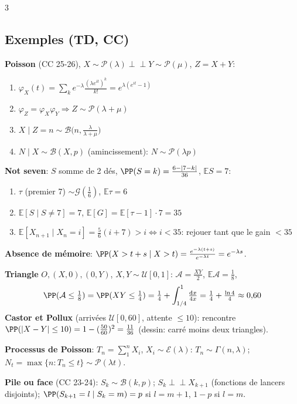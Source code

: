 \documentclass[12pt, a4paper]{article}
\newcommand{\dd}{\mathrm{d}}
\newcommand{\E}{\mathbb{E}}
\begin{document}
\begin{multicols*}{3}
	\colbreak
	\subsection{Exemples (TD, CC)}
	\textbf{Poisson} (CC 25-26), $X\sim\mathcal P(\lambda)\perp\!\!\!\perp Y\sim\mathcal P(\mu)$, $Z=X+Y$:
	\begin{enumerate}[\roman*.]
		\item $\varphi_X(t)=\sum_k e^{-\lambda}\frac{(\lambda e^{it})^k}{k!}=e^{\lambda(e^{it}-1)}$
		\item $\varphi_Z=\varphi_X\varphi_Y\Rightarrow Z\sim\mathcal P(\lambda+\mu)$
		\item $X\mid Z=n\sim\mathcal B\big(n,\frac\lambda{\lambda+\mu}\big)$
		\item $N\mid X\sim\mathcal B(X,p)$ (amincissement): $N\sim\mathcal P(\lambda p)$
	\end{enumerate}
	\textbf{Not seven}: $S$ somme de 2 dés, $\PP(S=k)=\frac{6-|7-k|}{36}$, $\E S=7$:
	\begin{enumerate}[\roman*.]
		\item $\tau$ (premier 7) $\sim\mathcal G(\frac16)$, $\E\tau=6$
		\item $\E[S\mid S\neq7]=7$, $\E[G]=\E[\tau-1]\cdot7=35$
		\item $\E[X_{n+1}\mid X_n=i]=\frac56(i+7)>i\iff i<35$: rejouer tant que le gain $<35$
	\end{enumerate}
	\textbf{Absence de mémoire}: $\PP(X>t+s\mid X>t)=\frac{e^{-\lambda(t+s)}}{e^{-\lambda t}}=e^{-\lambda s}$.

	\textbf{Triangle} $O,(X,0),(0,Y)$, $X,Y\sim\mathcal U[0,1]$: $\mathcal A=\frac{XY}2$, $\E\mathcal A=\frac18$,
	\begin{gather*}
		\PP(\mathcal A\leq\tfrac18)=\PP(XY\leq\tfrac14)=\tfrac14+\int_{1/4}^1\tfrac{\dd x}{4x}=\tfrac14+\tfrac{\ln4}4\approx0{,}60
	\end{gather*}
	\textbf{Castor et Pollux} (arrivées $\mathcal U[0,60]$, attente $\leq10$): rencontre $\PP(|X-Y|\leq10)=1-(\frac{50}{60})^2=\frac{11}{36}$ (dessin: carré moins deux triangles).

	\textbf{Processus de Poisson}: $T_n=\sum_1^nX_i$, $X_i\sim\mathcal E(\lambda)$: $T_n\sim\Gamma(n,\lambda)$; $N_t=\max\{n:T_n\leq t\}\sim\mathcal P(\lambda t)$.

	\textbf{Pile ou face} (CC 23-24): $S_k\sim\mathcal B(k,p)$; $S_k\perp\!\!\!\perp X_{k+1}$ (fonctions de lancers disjoints); $\PP(S_{k+1}=l\mid S_k=m)=p$ si $l=m+1$, $1-p$ si $l=m$.


\end{multicols*}
\end{document}
